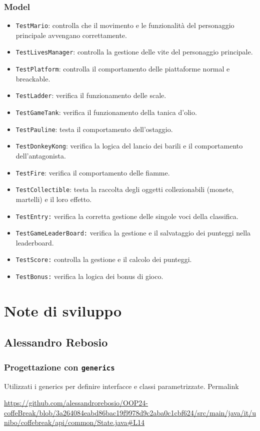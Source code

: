 \documentclass[a4paper,12pt]{report}
\begin{document}
\subsubsection*{Model}
\begin{itemize}
	\item \texttt{TestMario}: controlla che il movimento e le funzionalità del personaggio principale avvengano correttamente.
	\item \texttt{TestLivesManager}: controlla la gestione delle vite del personaggio principale.
	\item \texttt{TestPlatform}: controlla il comportamento delle piattaforme normal e breackable.
	\item \texttt{TestLadder}: verifica il funzionamento delle scale.
	\item \texttt{TestGameTank}: verifica il funzionamento della tanica d'olio.
	\item \texttt{TestPauline}: testa il comportamento dell'ostaggio.
	\item \texttt{TestDonkeyKong}: verifica la logica del lancio dei barili e il comportamento dell'antagonista.
	\item \texttt{TestFire}: verifica il comportamento delle fiamme.
	\item \texttt{TestCollectible}: testa la raccolta degli oggetti collezionabili (monete, martelli) e il loro effetto.
	\item \texttt{TestEntry:} verifica la corretta gestione delle singole voci della classifica.
	\item \texttt{TestGameLeaderBoard:} verifica la gestione e il salvataggio dei punteggi nella leaderboard.
	\item \texttt{TestScore:} controlla la gestione e il calcolo dei punteggi.
	\item \texttt{TestBonus:} verifica la logica dei bonus di gioco.
\end{itemize}

\newpage
\section{Note di sviluppo}

\subsection{Alessandro Rebosio}
\subsubsection{Progettazione con \texttt{generics}}
Utilizzati i generics per definire interfacce e classi parametrizzate. Permalink
\begin{sloppypar}
	\raggedright
	\url{https://github.com/alessandrorebosio/OOP24-coffeBreak/blob/3a264084eabd86bac19f9978d9c2aba0c1cbf624/src/main/java/it/unibo/coffebreak/api/common/State.java#L14}
\end{sloppypar}
\end{document}
